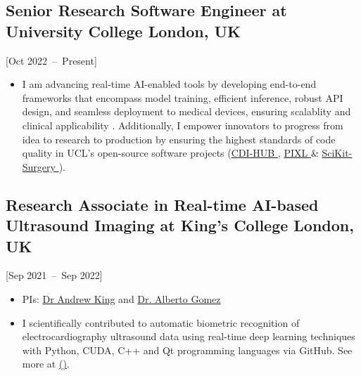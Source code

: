 \documentclass{mycv}
\begin{document}
\subsection{Senior Research Software Engineer at University College London, UK}[Oct 2022~--~Present]
\begin{itemize}
  \item 
I am advancing real-time AI-enabled tools by developing end-to-end frameworks that encompass model training, efficient inference, robust API design, and seamless deployment to medical devices, ensuring scalablity and clinical applicability \href{https://mxochicale.github.io/real-time-ai-for-surgery-with-NVIDIA-Holoscan-platform/#/section}{\faExternalLink*}.
Additionally, I empower innovators to progress from idea to research to production by ensuring the highest standards of code quality in UCL's open-source software projects (\href{https://github.com/UCL-CDI/cdi-hub}{CDI-HUB \faGithub*}, \href{https://github.com/UCLH-Foundry/PIXL}{PIXL \faGithub*} \& \href{https://github.com/SciKit-Surgery}{SciKit-Surgery \faGithub*}).

\end{itemize}


\subsection{Research Associate in Real-time AI-based Ultrasound Imaging at King's College London, UK}[Sep 2021~--~Sep 2022]
\begin{itemize}
  \item PIs: \href{http://kclmmag.org/}{Dr Andrew King} and  \href{https://gomezalberto.github.io/}{Dr. Alberto Gomez}
  \item 
I scientifically contributed to automatic biometric recognition of electrocardiography ultrasound data using real-time deep learning techniques with Python, CUDA, C++ and Qt programming languages via GitHub.
See more at \href{http://vital.oucru.org/major-partners/kings-college-london/}{(\faExternalLink*)}.
\end{itemize}
\end{document}
